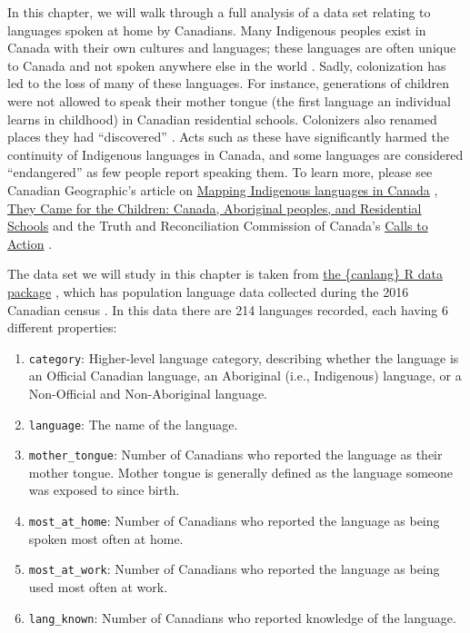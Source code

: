 \documentclass[
]{book}
\providecommand{\tightlist}{%
  \setlength{\itemsep}{0pt}\setlength{\parskip}{0pt}}
\begin{document}
In this chapter,  we will walk through a full analysis of a data set relating to
languages spoken at home by Canadians. Many Indigenous peoples exist in Canada
with their own cultures and languages; these languages are often unique to Canada and not spoken
anywhere else in the world \citep{statcan2018mothertongue}. Sadly, colonization has
led to the loss of many of these languages. For instance, generations of
children were not allowed to speak their mother tongue (the first language an
individual learns in childhood) in Canadian residential schools. Colonizers
also renamed places they had ``discovered'' \citep{wilson2018}. Acts such as these
have significantly harmed the continuity of Indigenous languages in Canada, and
some languages are considered ``endangered'' as few people report speaking them.
To learn more, please see Canadian Geographic's article on
\href{https://www.canadiangeographic.ca/article/mapping-indigenous-languages-canada}{Mapping Indigenous languages in Canada}
\citep{walker2017}, \href{http://publications.gc.ca/site/archivee-archived.html?url=http://publications.gc.ca/collections/collection_2012/cvrc-trcc/IR4-4-2012-eng.pdf}{They Came for the Children: Canada, Aboriginal peoples, and Residential Schools} \citep{children2012}
and the Truth and Reconciliation Commission of
Canada's \href{http://trc.ca/assets/pdf/Calls_to_Action_English2.pdf}{Calls to Action} \citep{calls2015}.

The data set we will study in this chapter is taken from
\href{https://ttimbers.github.io/canlang/}{the \{canlang\} R data package} \citep{timbers2020canlang}, which has
population language data collected during the 2016 Canadian census \citep{cancensus2016}.
In this data there are 214 languages recorded, each having 6 different properties:

\begin{enumerate}
\def\labelenumi{\arabic{enumi}.}
\tightlist
\item
  \texttt{category}: Higher-level language category, describing whether the language is an Official Canadian language, an Aboriginal (i.e., Indigenous) language, or a Non-Official and Non-Aboriginal language.
\item
  \texttt{language}: The name of the language.
\item
  \texttt{mother\_tongue}: Number of Canadians who reported the language as their mother tongue. Mother tongue is generally defined as the language someone was exposed to since birth.
\item
  \texttt{most\_at\_home}: Number of Canadians who reported the language as being spoken most often at home.
\item
  \texttt{most\_at\_work}: Number of Canadians who reported the language as being used most often at work.
\item
  \texttt{lang\_known}: Number of Canadians who reported knowledge of the language.
\end{enumerate}
\end{document}
